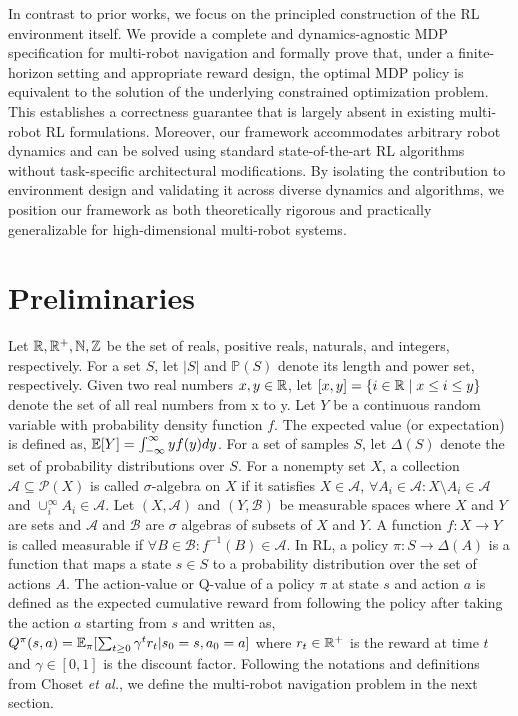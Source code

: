 \documentclass[letterpaper, 10 pt, conference]{ieeeconf}  %
\begin{document}
In contrast to prior works, we focus on the principled construction of the RL environment itself. We provide a complete and dynamics-agnostic MDP specification for multi-robot navigation and formally prove that, under a finite-horizon setting and appropriate reward design, the optimal MDP policy is equivalent to the solution of the underlying constrained optimization problem. This establishes a correctness guarantee that is largely absent in existing multi-robot RL formulations. Moreover, our framework accommodates arbitrary robot dynamics and can be solved using standard state-of-the-art RL algorithms without task-specific architectural modifications. By isolating the contribution to environment design and validating it across diverse dynamics and algorithms, we position our framework as both theoretically rigorous and practically generalizable for high-dimensional multi-robot systems.

\section{Preliminaries}
\label{sec:background}
Let $\mathbb{R}, \mathbb{R}^+, \mathbb{N}, \mathbb{Z}$ be the set of reals, positive reals, naturals, and integers, respectively. For a set $S$, let $|S|$ and $\mathbb{P}(S)$ denote its length and power set, respectively.  Given two real numbers $x,y \in \mathbb{R}$, let $[x,y] = \{ i \in \mathbb{R} \mid x \leq i \leq y \}$ denote the set of all real numbers from x to y. Let $Y$ be a continuous random variable with probability density function $f$. The expected value (or expectation) is defined as, $\mathbb{E}[Y] = \int_{-\infty}^{\infty} y f(y)dy$. For a set of samples $S$, let $\Delta(S)$ denote the set of probability distributions over $S$. For a nonempty set $X$, a collection $\mathcal{A} \subseteq \mathcal{P}(X)$ is called $\sigma$-algebra \cite{tao2011} on $X$ if it satisfies $X \in \mathcal{A}$, $\forall A_i \in \mathcal{A}: X \setminus A_i \in \mathcal{A}$ and $ \cup_i^{\infty}A_i \in \mathcal{A}$. Let $(X, \mathcal{A})$ and $(Y, \mathcal{B})$ be measurable spaces where $X$ and $Y$ are sets and $\mathcal{A}$ and $\mathcal{B}$ are $\sigma$ algebras of subsets of $X$ and $Y$. A function $f: X \to Y$ is called measurable if $\forall B \in \mathcal{B}: f^{-1}(B)\in \mathcal{A}$. In RL, a policy $\pi: S \to \Delta (A)$ is a function that maps a state $s \in S$ to a probability distribution over the set of actions $A$. The action-value or Q-value of a policy $\pi$ at state $s$ and action $a$ is defined as the expected cumulative reward from following the policy after taking the action $a$ starting from $s$ and written as, $Q^{\pi}(s,a) = \mathbb{E}_{\pi}[\sum_{t\geq0}\gamma^t r_t | s_0=s, a_0=a]$ where $r_t \in \mathbb{R}^+$ is the reward at time $t$ and $\gamma \in [0,1]$ is the discount factor. Following the notations and definitions from Choset \textit{et al.}\cite{choset2005}, we define the multi-robot navigation problem in the next section.
\end{document}
